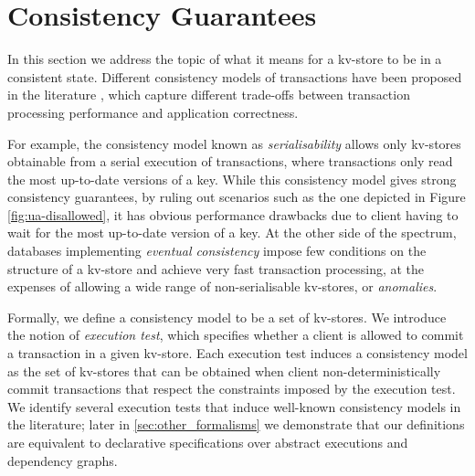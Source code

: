 \section{Consistency Guarantees}
\label{sec:cm}
In this section we address the topic of what it means for a kv-store 
to be in a consistent state. Different consistency models of transactions have 
been proposed in the literature \cite{ev_principles,rola,cops,redblue,PSI,clocksi}, which capture different trade-offs 
between transaction processing performance and application correctness. 

For example, the consistency model known as \emph{serialisability} allows only kv-stores 
obtainable from a serial execution of transactions, where transactions only read the most up-to-date 
versions of a key. While this consistency model gives strong consistency guarantees, by ruling out scenarios 
such as the one depicted in Figure \ref{fig:ua-disallowed}, it has obvious performance drawbacks due to client 
having to wait for the most up-to-date version of a key. At the other side of the spectrum, databases 
implementing \emph{eventual consistency} impose few conditions on the structure of a kv-store 
and achieve very fast transaction processing, at the expenses 
of allowing a wide range of non-serialisable kv-stores, or \emph{anomalies}.

Formally, we define a consistency model to be a set of kv-stores. We introduce the notion of 
\emph{execution test}, which specifies whether a client is allowed to commit a transaction in a given 
kv-store. Each execution test induces a consistency model as the set of kv-stores that 
can be obtained when client non-deterministically commit transactions that respect the constraints 
imposed by the execution test. We identify several execution tests that induce well-known consistency 
models in the literature; later in \cref{sec:other_formalisms} we demonstrate that our definitions are equivalent 
to declarative specifications over abstract executions and dependency graphs.





